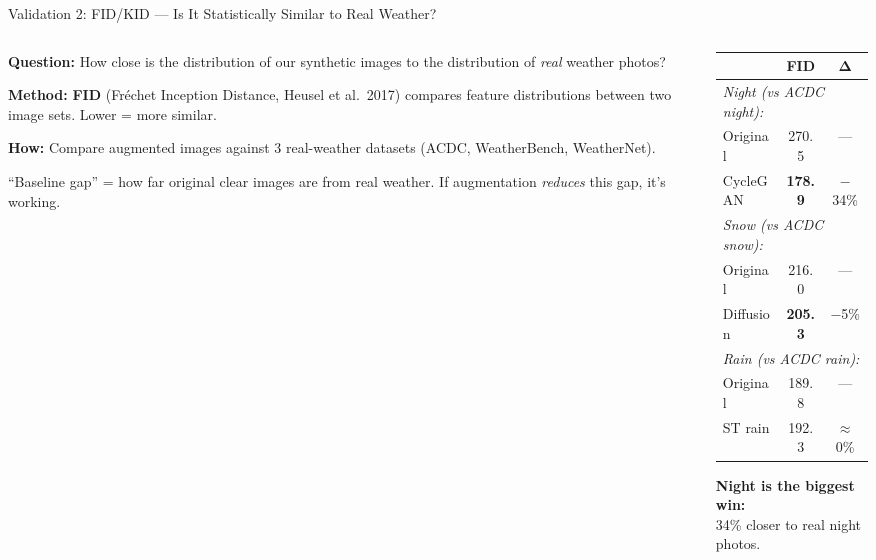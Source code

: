\documentclass[aspectratio=169, 11pt]{beamer}
\begin{document}
\begin{frame}{Validation 2: FID/KID --- Is It Statistically Similar to Real Weather?}

\begin{columns}[T]
\begin{column}{0.55\textwidth}
\textbf{Question:} How close is the distribution of our synthetic images to the distribution of \textit{real} weather photos?

\vspace{0.3em}
\textbf{Method:} \textbf{FID} (Fr\'{e}chet Inception Distance, Heusel et al.\ 2017) compares feature distributions between two image sets. Lower = more similar.

\vspace{0.3em}
\textbf{How:} Compare augmented images against 3 real-weather datasets (ACDC, WeatherBench, WeatherNet).

\vspace{0.2em}
``Baseline gap'' = how far original clear images are from real weather. If augmentation \textit{reduces} this gap, it's working.
\end{column}
\begin{column}{0.43\textwidth}
\centering
\footnotesize
\begin{tabular}{lcc}
\toprule
 & \textbf{FID} & $\boldsymbol{\Delta}$ \\
\midrule
\multicolumn{3}{l}{\textit{Night (vs ACDC night):}} \\
Original & 270.5 & --- \\
CycleGAN & \textbf{178.9} & {\color{goodgreen}$-$34\%} \\
\midrule
\multicolumn{3}{l}{\textit{Snow (vs ACDC snow):}} \\
Original & 216.0 & --- \\
Diffusion & \textbf{205.3} & {\color{goodgreen}$-$5\%} \\
\midrule
\multicolumn{3}{l}{\textit{Rain (vs ACDC rain):}} \\
Original & 189.8 & --- \\
ST rain & 192.3 & $\approx$0\% \\
\bottomrule
\end{tabular}

\vspace{0.3em}
\textbf{Night is the biggest win:}\\
34\% closer to real night photos.
\end{column}
\end{columns}
\end{frame}
\end{document}
